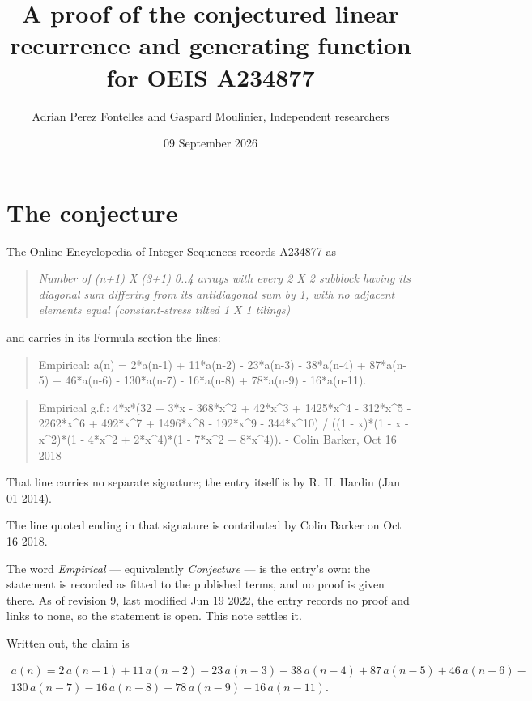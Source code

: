 \documentclass[11pt]{article}
\title{A proof of the conjectured linear recurrence and generating function for OEIS A234877}
\author{Adrian Perez Fontelles and Gaspard Moulinier, Independent researchers}
\date{09 September 2026}
\theoremstyle{definition}
\begin{document}
\maketitle
\section{The conjecture}

The Online Encyclopedia of Integer Sequences records \href{https://oeis.org/A234877}{A234877} as

\begin{quote}\itshape Number of (n+1) X (3+1) 0..4 arrays with every 2 X 2 subblock having its diagonal sum differing from its antidiagonal sum by 1, with no adjacent elements equal (constant-stress tilted 1 X 1 tilings)\end{quote}

and carries in its Formula section the lines:

\begin{quote}\ttfamily Empirical: a(n) = 2*a(n-1) + 11*a(n-2) - 23*a(n-3) - 38*a(n-4) + 87*a(n-5) + 46*a(n-6) - 130*a(n-7) - 16*a(n-8) + 78*a(n-9) - 16*a(n-11).\end{quote}

\begin{quote}\ttfamily Empirical g.f.: 4*x*(32 + 3*x - 368*x\textasciicircum{}2 + 42*x\textasciicircum{}3 + 1425*x\textasciicircum{}4 - 312*x\textasciicircum{}5 - 2262*x\textasciicircum{}6 + 492*x\textasciicircum{}7 + 1496*x\textasciicircum{}8 - 192*x\textasciicircum{}9 - 344*x\textasciicircum{}10) / ((1 - x)*(1 - x - x\textasciicircum{}2)*(1 - 4*x\textasciicircum{}2 + 2*x\textasciicircum{}4)*(1 - 7*x\textasciicircum{}2 + 8*x\textasciicircum{}4)). - Colin Barker, Oct 16 2018\end{quote}

That line carries no separate signature; the entry itself is by R. H. Hardin (Jan 01 2014).

The line quoted ending in that signature is contributed by Colin Barker on Oct 16 2018.

The word {\itshape Empirical} --- equivalently {\itshape Conjecture} --- is the entry's own: the statement is recorded as fitted to the published terms, and no proof is given there. As of revision 9, last modified Jun 19 2022, the entry records no proof and links to none, so the statement is open. This note settles it.

Written out, the claim is

\begin{multline*} a(n) = 2\,a(n-1) + 11\,a(n-2) - 23\,a(n-3) - 38\,a(n-4) + 87\,a(n-5) + 46\,a(n-6) - \\ 130\,a(n-7) - 16\,a(n-8) + 78\,a(n-9) - 16\,a(n-11). \end{multline*}
\end{document}
